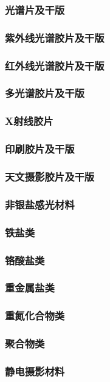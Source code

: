 \documentclass[UTF8]{../../ApplicationUniverse}
\begin{document}
        \subsubsection{光谱片及干版}
            \subsubsection{紫外线光谱胶片及干版}
            \subsubsection{红外线光谱胶片及干版}
            \subsubsection{多光谱胶片及干版}
        \subsubsection{X射线胶片}
        \subsubsection{印刷胶片及干版}
        \subsubsection{天文摄影胶片及干版}
    \subsubsection{非银盐感光材料}
        \subsubsection{铁盐类}
        \subsubsection{铬酸盐类}
        \subsubsection{重金属盐类}
        \subsubsection{重氮化合物类}
        \subsubsection{聚合物类}
        \subsubsection{静电摄影材料}
\end{document}

